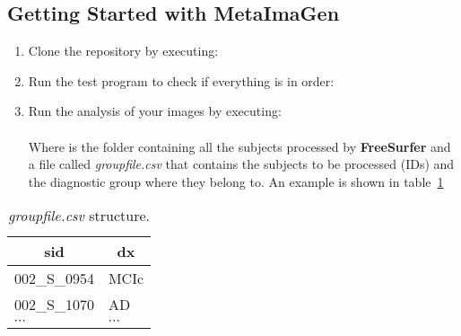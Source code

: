 \subsection{Getting Started with MetaImaGen}
\begin{enumerate}
	\item Clone the repository by executing: \\
	\item Run the test program to check if everything is in order:\\
	\item Run the analysis of your images by executing:\\
		\\
		
		Where  is the folder containing all the subjects processed by \textbf{FreeSurfer} and a file called \textit{groupfile.csv} that contains the subjects to be processed (IDs) and the diagnostic group where they belong to. An example is shown in table~\ref{table:groupfile}
\end{enumerate}


\begin{table}[!h]
\centering
\begin{tabular}{|l|l|}
\hline
\multicolumn{1}{|c|}{\textbf{sid}} & \multicolumn{1}{c|}{\textbf{dx}} \\ \hline
002\_S\_0954                       & MCIc                             \\ \hline
002\_S\_1070                       & AD                               \\ \hline
$\cdots$                           & $\cdots$                         \\ \hline
\end{tabular}
\caption{\textit{groupfile.csv} structure.}
\label{table:groupfile}
\end{table}